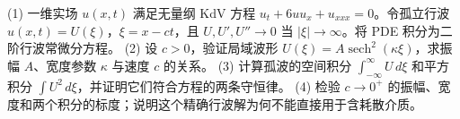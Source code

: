 (1) 一维实场 \(u(x,t)\) 满足无量纲 KdV 方程 \(u_t+6uu_x+u_{xxx}=0\)。令孤立行波 \(u(x,t)=U(\xi)\)，\(\xi=x-ct\)，且 \(U,U',U''\to0\) 当 \(|\xi|\to\infty\)。将 PDE 积分为二阶行波常微分方程。
(2) 设 \(c>0\)，验证局域波形 \(U(\xi)=A\operatorname{sech}^2(\kappa\xi)\)，求振幅 \(A\)、宽度参数 \(\kappa\) 与速度 \(c\) 的关系。
(3) 计算孤波的空间积分 \(\int_{-\infty}^\infty U\,d\xi\) 和平方积分 \(\int U^2\,d\xi\)，并证明它们符合方程的两条守恒律。
(4) 检验 \(c\to0^+\) 的振幅、宽度和两个积分的标度；说明这个精确行波解为何不能直接用于含耗散介质。

